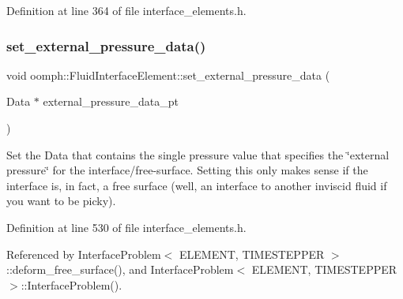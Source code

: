 Definition at line 364 of file interface\+\_\+elements.\+h.

\mbox{\label{classoomph_1_1FluidInterfaceElement_a7230ddea36eb36938d64583e5ee4b15f}} 
\subsubsection{\texorpdfstring{set\+\_\+external\+\_\+pressure\+\_\+data()}{set\_external\_pressure\_data()}\hspace{0.1cm}{\footnotesize\ttfamily [1/2]}}
{\footnotesize\ttfamily void oomph\+::\+Fluid\+Interface\+Element\+::set\+\_\+external\+\_\+pressure\+\_\+data (\begin{DoxyParamCaption}\item[{Data $\ast$}]{external\+\_\+pressure\+\_\+data\+\_\+pt }\end{DoxyParamCaption})\hspace{0.3cm}{\ttfamily [inline]}}



Set the Data that contains the single pressure value that specifies the \char`\"{}external pressure\char`\"{} for the interface/free-\/surface. Setting this only makes sense if the interface is, in fact, a free surface (well, an interface to another inviscid fluid if you want to be picky). 



Definition at line 530 of file interface\+\_\+elements.\+h.



Referenced by Interface\+Problem$<$ E\+L\+E\+M\+E\+N\+T, T\+I\+M\+E\+S\+T\+E\+P\+P\+E\+R $>$\+::deform\+\_\+free\+\_\+surface(), and Interface\+Problem$<$ E\+L\+E\+M\+E\+N\+T, T\+I\+M\+E\+S\+T\+E\+P\+P\+E\+R $>$\+::\+Interface\+Problem().

\mbox{\label{classoomph_1_1FluidInterfaceElement_a87ee1f3227c456a4c30df77c4d0bad6b}} 
